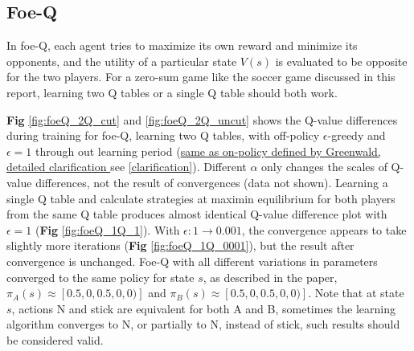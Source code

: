 \documentclass[10pt]{article}
\begin{document}

\subsection{Foe-Q} \label{foeQ}
In foe-Q, each agent tries to maximize its own reward and minimize its opponents, and the utility of a particular state $V(s)$ is evaluated to be opposite for the two players. For a zero-sum game like the soccer game discussed in this report, learning two Q tables or a single Q table should both work.\par \textbf{Fig} \ref{fig:foeQ_2Q_cut} and \ref{fig:foeQ_2Q_uncut} shows the Q-value differences during training for foe-Q, learning two Q tables, with off-policy $\epsilon$-greedy and $\epsilon=1$ through out learning period (\ul{same as on-policy defined by Greenwald, detailed clarification }see \ref{clarification})\cite{GreenwaldCorrelatedQLearning2005}. Different $\alpha$ only changes the scales of Q-value differences, not the result of convergences (data not shown). Learning a single Q table and calculate strategies at maximin equilibrium for both players from the same Q table produces almost identical Q-value difference plot with $\epsilon=1$ (\textbf{Fig} \ref{fig:foeQ_1Q_1}). With $\epsilon:1\rightarrow0.001$, the convergence appears to take slightly more iterations (\textbf{Fig} \ref{fig:foeQ_1Q_0001}), but the result after convergence is unchanged. Foe-Q with all different variations in parameters converged to the same policy for state $s$, as described in the paper\cite{GreenwaldCorrelatedQLearning2003}, $\pi_A(s)\approx[0.5,0,0.5,0,0)]$ and $\pi_B(s)\approx[0.5,0,0.5,0,0)]$. Note that at state $s$, actions N and stick are equivalent for both A and B, sometimes the learning algorithm converges to N, or partially to N, instead of stick, such results should be considered valid.
\end{document}
